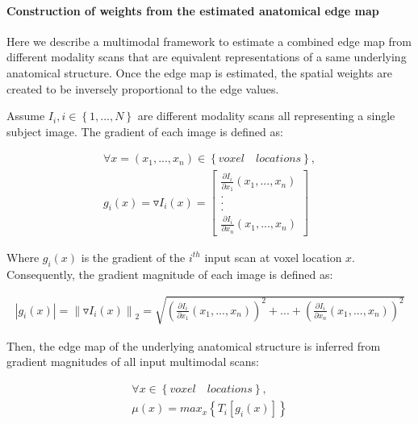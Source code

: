 \paragraph{Construction of weights from the estimated anatomical edge map}
\label{section:estimateLabelMap}

Here we describe a multimodal framework to estimate a combined edge map from different modality scans that are equivalent representations of a same underlying anatomical structure. Once the edge map is estimated, the spatial weights are created to be inversely proportional to the edge values.

Assume $I_{i}, i\in \left \{ 1,...,N \right \}$ are different modality scans all representing a single subject image. The gradient of each image is defined as:

\begin{equation}
\label{eq:gradient}
\begin{gathered}
\forall x=(x_{1}, ..., x_{n})\in \left\{voxel \quad locations\right\}, \\
g_{i}(x) = \triangledown I_{i}(x) = \begin{bmatrix}
\frac{\partial I_{i}}{\partial x_{1}}(x_{1}, ..., x_{n}) \\ 
.\\ 
.\\ 
.\\ 
\frac{\partial I_{i}}{\partial x_{n}}(x_{1}, ..., x_{n})
\end{bmatrix}
\end{gathered}
\end{equation}

Where $g_{i}(x)$ is the gradient of the $i^{th}$ input scan at voxel location $x$.
Consequently, the gradient magnitude of each image is defined as:

\begin{equation}
\label{eq:gradientMagnitude}
\begin{gathered}
\left | g_{i}(x) \right | = \left \| \triangledown I_{i}(x) \right \|_{2} = \sqrt{ (\frac{\partial I_{i}}{\partial x_{1}}(x_{1}, ..., x_{n}))^{2} + ... + (\frac{\partial I_{i}}{\partial x_{n}}(x_{1}, ..., x_{n}))^{2} }
\end{gathered}
\end{equation}

Then, the edge map of the underlying anatomical structure is inferred from gradient magnitudes of all input multimodal scans:

\begin{equation}
\label{eq:edgemap}
\begin{gathered}
\forall x\in \left\{voxel \quad locations\right\}, \\
\mu (x) = 
max_{x}
\left \{ T_{i}\left [ g_{i}(x) \right ] \right \}
\end{gathered}
\end{equation}

